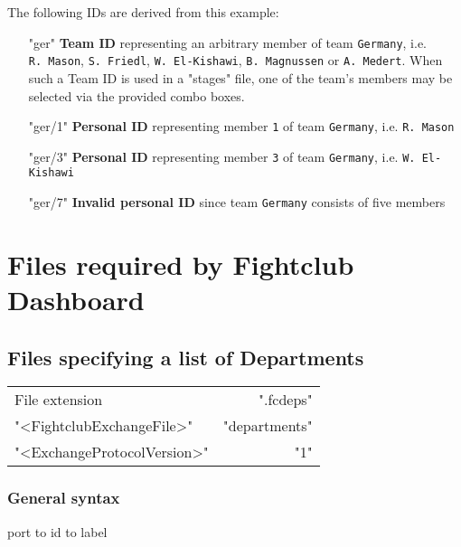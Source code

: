 \documentclass[11pt]{ltxdoc}
\newlength{\ccharwidth}
\def\tab{\hbox to \ccharwidth {{\rmfamily\small\mapsto}}}
\begin{document}
    \bigskip
    The following IDs are derived from this example:
    \begin{itemize}
        \item["ger"] \textbf{Team ID}
            representing an arbitrary member of team \texttt{Germany}, i.e. \texttt{R.~Mason}, \texttt{S.~Friedl}, \texttt{W.~El-Kishawi}, \texttt{B.~Magnussen} or \texttt{A.~Medert}.
            When such a Team ID is used in a "stages" file, one of the team's members may be selected via the provided combo boxes.
        
        \item["ger/1"] \textbf{Personal ID}
            representing member \texttt{1} of team \texttt{Germany}, i.e. \texttt{R.~Mason}
        
        \item["ger/3"] \textbf{Personal ID}
            representing member \texttt{3} of team \texttt{Germany}, i.e. \texttt{W. El-Kishawi}
        
        \item["ger/7"] \textbf{Invalid personal ID}
            since team \texttt{Germany} consists of five members
    \end{itemize}
    
    
    
    
    
    \clearpage
    \section{Files required by Fightclub Dashboard}
    \subsection{Files specifying a list of Departments}
    \begin{center}
        \begin{tabular}{lr}
            File extension              & ".fcdeps" \\
            "<FightclubExchangeFile>"   & "departments" \\
            "<ExchangeProtocolVersion>" & "1"
        \end{tabular}
    \end{center}
    
    
    \subsubsection*{General syntax}
    \begin{center}\ttfamily
        port  \tab  id  \tab  label
    \end{center}
\end{document}
